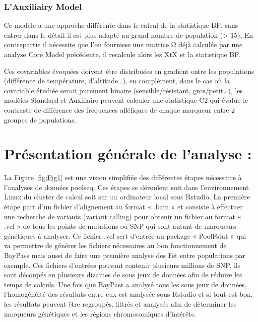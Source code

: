 \documentclass[
  openany]{book}
\begin{document}
\hypertarget{lauxiliairy-model}{%
\subsubsection*{L'Auxiliairy Model}\label{lauxiliairy-model}}

Ce modèle a une approche différente dans le calcul de la statistique BF, sans entrer dans le détail il est plus adapté au grand nombre de population (\textgreater{} 15), En contrepartie il nécessite que l'on fournisse une matrice Ω déjà calculée par une analyse Core Model précédente, il recalcule alors les XtX et la statistique BF.

Ces covariables évoquées doivent être distribuées en gradient entre les populations (différence de température, d'altitude\ldots), en complément, dans le cas où la covariable étudiée serait purement binaire (sensible/résistant, gros/petit\ldots), les modèles Standard et Auxiliaire peuvent calculer une statistique C2 qui évalue le contraste de différence des fréquences alléliques de chaque marqueur entre 2 groupes de populations.

\hypertarget{pruxe9sentation-guxe9nuxe9rale-de-lanalyse}{%
\section*{Présentation générale de l'analyse :}\label{pruxe9sentation-guxe9nuxe9rale-de-lanalyse}}

La Figure \ref{fig:Fig1} est une vision simplifiée des différentes étapes nécessaire à l'analyses de données poolseq. Ces étapes se déroulent soit dans l'environnement Linux du cluster de calcul soit sur un ordinateur local sous Rstudio.
La première étape part d'un fichier d'alignement au format « .bam » et consiste à effectuer une recherche de variants (variant calling) pour obtenir un fichier au format « .vcf » de tous les points de mutations ou SNP qui sont autant de marqueurs génétiques à analyser. Ce fichier .vcf sert d'entrée au package « PoolFstat » qui va permettre de générer les fichiers nécessaires au bon fonctionnement de BayPass mais aussi de faire une première analyse des Fst entre populations par exemple. Ces fichiers d'entrées pouvant contenir plusieurs millions de SNP, ils sont découpés en plusieurs dizaines de sous jeux de données afin de réduire les temps de calculs. Une fois que BayPass a analysé tous les sous jeux de données, l'homogénéité des résultats entre eux est analysée sous Rstudio et si tout est bon, les résultats peuvent être regroupés, filtrés et analysés afin de déterminer les marqueurs génétiques et les régions chromosomiques d'intérêts.
\end{document}
